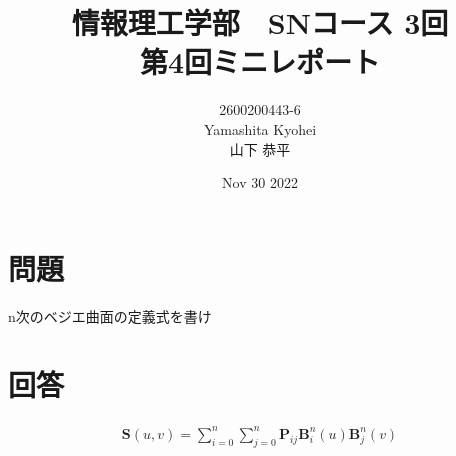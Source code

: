 \documentclass[dvipdfmx,autodetect-engine,titlepage]{jsarticle}
\title{情報理工学部　SNコース 3回\\
第4回ミニレポート\\}
\author{2600200443-6\\Yamashita Kyohei\\山下 恭平}
\date{Nov 30 2022}
\begin{document}
\maketitle

\section*{問題}
n次のベジエ曲面の定義式を書け

\section*{回答}

\begin{align*}
  \mathbf{S}(u,v) = \sum^{n}_{i=0} \sum^{n}_{j=0} \mathbf{P}_{ij} \mathbf{B}^{n}_{i}(u) \mathbf{B}^{n}_{j}(v)
\end{align*}
\end{document}
